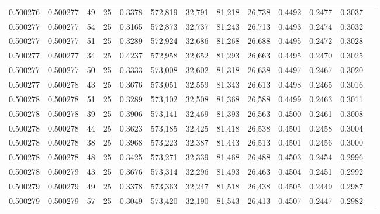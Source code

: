 \begin{tabular}{rrrrrrrrrrrrr}
0.500276 & 0.500277 &    49 &  25 &                                     0.3378 & 572,819 &  32,791 &  81,218 &  26,738 & 0.4492 & 0.2477 & 0.3037 \\
0.500277 & 0.500277 &    54 &  25 &                                     0.3165 & 572,873 &  32,737 &  81,243 &  26,713 & 0.4493 & 0.2474 & 0.3032 \\
0.500277 & 0.500277 &    51 &  25 &                                     0.3289 & 572,924 &  32,686 &  81,268 &  26,688 & 0.4495 & 0.2472 & 0.3028 \\
0.500277 & 0.500277 &    34 &  25 &                                     0.4237 & 572,958 &  32,652 &  81,293 &  26,663 & 0.4495 & 0.2470 & 0.3025 \\
0.500277 & 0.500277 &    50 &  25 &                                     0.3333 & 573,008 &  32,602 &  81,318 &  26,638 & 0.4497 & 0.2467 & 0.3020 \\
0.500277 & 0.500278 &    43 &  25 &                                     0.3676 & 573,051 &  32,559 &  81,343 &  26,613 & 0.4498 & 0.2465 & 0.3016 \\
0.500278 & 0.500278 &    51 &  25 &                                     0.3289 & 573,102 &  32,508 &  81,368 &  26,588 & 0.4499 & 0.2463 & 0.3011 \\
0.500278 & 0.500278 &    39 &  25 &                                     0.3906 & 573,141 &  32,469 &  81,393 &  26,563 & 0.4500 & 0.2461 & 0.3008 \\
0.500278 & 0.500278 &    44 &  25 &                                     0.3623 & 573,185 &  32,425 &  81,418 &  26,538 & 0.4501 & 0.2458 & 0.3004 \\
0.500278 & 0.500278 &    38 &  25 &                                     0.3968 & 573,223 &  32,387 &  81,443 &  26,513 & 0.4501 & 0.2456 & 0.3000 \\
0.500278 & 0.500278 &    48 &  25 &                                     0.3425 & 573,271 &  32,339 &  81,468 &  26,488 & 0.4503 & 0.2454 & 0.2996 \\
0.500278 & 0.500279 &    43 &  25 &                                     0.3676 & 573,314 &  32,296 &  81,493 &  26,463 & 0.4504 & 0.2451 & 0.2992 \\
0.500279 & 0.500279 &    49 &  25 &                                     0.3378 & 573,363 &  32,247 &  81,518 &  26,438 & 0.4505 & 0.2449 & 0.2987 \\
0.500279 & 0.500279 &    57 &  25 &                                     0.3049 & 573,420 &  32,190 &  81,543 &  26,413 & 0.4507 & 0.2447 & 0.2982 \\

\end{tabular}
